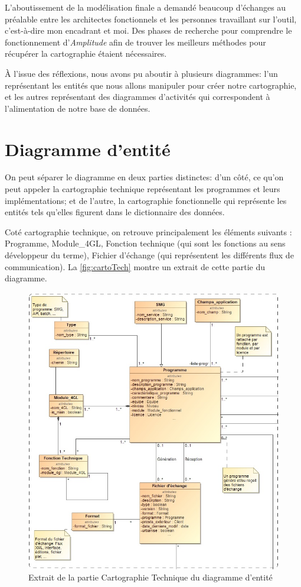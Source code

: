\documentclass{polytech/polytech}
\begin{document}
L'aboutissement de la modélisation finale a demandé beaucoup d'échanges au préalable entre les architectes fonctionnels et les personnes travaillant sur l'outil, c'est-à-dire mon encadrant et moi. Des phases de recherche pour comprendre le fonctionnement d'\textit{Amplitude} afin de trouver les meilleurs méthodes pour récupérer la cartographie étaient nécessaires. 

À l'issue des réflexions, nous avons pu aboutir à plusieurs diagrammes: l'un représentant les entités que nous allons manipuler pour créer notre cartographie, et les autres représentant des diagrammes d'activités qui correspondent à l'alimentation de notre base de données.


\section{Diagramme d'entité}

On peut séparer le diagramme en deux parties distinctes: d'un côté, ce qu'on peut appeler la cartographie technique représentant les programmes et leurs implémentations; et de l'autre, la cartographie fonctionnelle qui représente les entités tels qu'elles figurent dans le dictionnaire des données.

Coté cartographie technique, on retrouve principalement les éléments suivants : Programme, Module\_4GL, Fonction technique (qui sont les fonctions au sens développeur du terme), Fichier d'échange (qui représentent les différents flux de communication). La \autoref{fig:cartoTech} montre un extrait de cette partie du diagramme.

\begin{figure}
	\includegraphics[scale=0.6]{images/diagCarto}
	\caption{Extrait de la partie Cartographie Technique du diagramme d'entité}
	\label{fig:cartoTech}
\end{figure}
\end{document}
